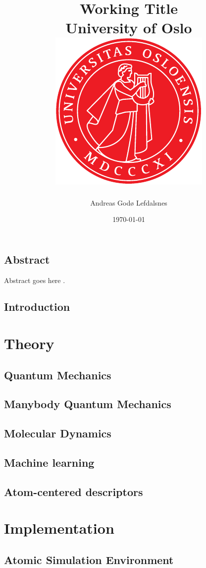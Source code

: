 \documentclass[12pt]{report}
\title{
{Working Title}\\
{\Large University of Oslo}\\
{\includegraphics{uio.pdf}}
}
\author{Andreas Godø Lefdalsnes}
\date{\today}
\begin{document}
\maketitle

\chapter*{Abstract}
Abstract goes here \parencite[e.g.][page 300]{einstein}.

\tableofcontents

\chapter{Introduction}


\part{Theory}

\chapter{Quantum Mechanics}


\chapter{Manybody Quantum Mechanics}


\chapter{Molecular Dynamics}


\chapter{Machine learning}


\chapter{Atom-centered descriptors}


\part{Implementation}
\chapter{Atomic Simulation Environment}

\end{document}
